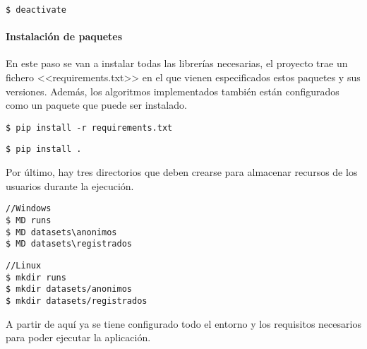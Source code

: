 \begin{tcolorbox}[colback=cyan!5!white,colframe=cyan!75!black,title=Para desactivar el entorno (una vez en él)]
\begin{verbatim}
$ deactivate
\end{verbatim}
\end{tcolorbox}
\paragraph{Instalación de paquetes} En este paso se van a instalar todas las
librerías necesarias, el proyecto trae un fichero <<requirements.txt>> en el que
vienen especificados estos paquetes y sus versiones. Además, los algoritmos
implementados también están configurados como un paquete que puede ser
instalado.
\begin{tcolorbox}[colback=cyan!5!white,colframe=orange!75!black,title=Instalar librerías externas]
\begin{verbatim}
$ pip install -r requirements.txt
\end{verbatim}
\end{tcolorbox}

\begin{tcolorbox}[colback=cyan!5!white,colframe=orange!75!black,title=Instalar resto de paquetes (definidos en setup.py)]
\begin{verbatim}
$ pip install .
\end{verbatim}
\end{tcolorbox}

Por último, hay tres directorios que deben crearse para almacenar recursos de
los usuarios durante la ejecución.

\begin{tcolorbox}[colback=cyan!5!white,colframe=cyan!75!black,fontupper=\footnotesize,fontlower=\footnotesize,title=Creación de directorios (desde \texttt{/web/app})]
\begin{verbatim}
//Windows
$ MD runs
$ MD datasets\anonimos
$ MD datasets\registrados
\end{verbatim}
\tcblower
\begin{verbatim}
//Linux
$ mkdir runs
$ mkdir datasets/anonimos
$ mkdir datasets/registrados
\end{verbatim}
\end{tcolorbox}


A partir de aquí ya se tiene configurado todo el entorno y los requisitos
necesarios para poder ejecutar la aplicación.

